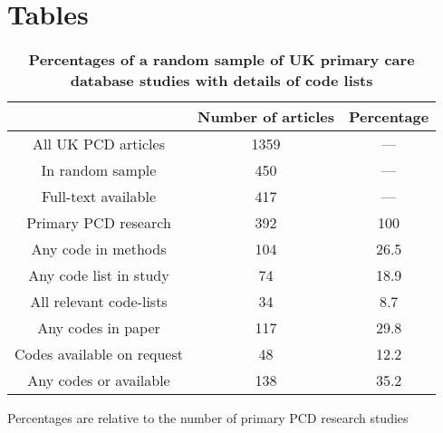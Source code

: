 \documentclass[10pt]{article}
\begin{document}





\section*{Tables}

\begin{table}[!ht]
  \caption{
    \bf{Percentages of a random sample of UK primary care database studies with details of code lists}}
  \begin{tabular}{|c|c|c|}
    \hline
                 & Number of articles & Percentage \\
    \hline
    All UK PCD articles        & 1359 & ---  \\
    In random sample           & 450  & ---  \\
    Full-text available        & 417  & ---  \\
    Primary PCD research       & 392  & 100  \\
    Any code in methods        & 104  & 26.5 \\
    Any code list in study     & 74   & 18.9 \\
    All relevant code-lists    & 34   & 8.7  \\
    Any codes in paper         & 117  & 29.8 \\
    Codes available on request & 48   & 12.2 \\
    Any codes or available     & 138  & 35.2 \\
    \hline
  \end{tabular}
  \begin{flushleft}Percentages are relative to the number of primary PCD research studies 
  \end{flushleft}
  \label{tab:table1_percentages}
\end{table}
\end{document}
